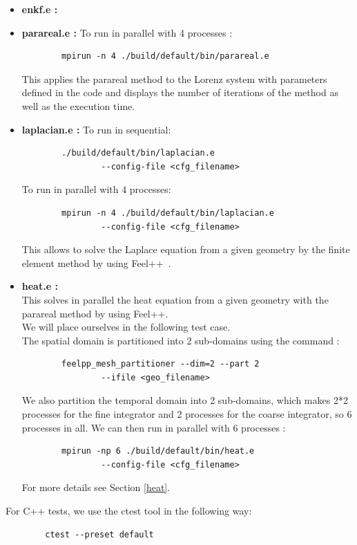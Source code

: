 \begin{enumerate}[label=\textbullet]
		\begin{itemize}[label=-]
			\item \textbf{enkf.e : } 
			\item \textbf{parareal.e : } To run in parallel with 4 processes :
\begin{lstlisting}
		mpirun -n 4 ./build/default/bin/parareal.e
\end{lstlisting}
			This applies the parareal method to the Lorenz system with parameters defined in the code and displays the number of iterations of the method as well as the execution time. 
			\item \textbf{laplacian.e : } To run in sequential:
\begin{lstlisting}
		./build/default/bin/laplacian.e 
				--config-file <cfg_filename>
\end{lstlisting}
			To run in parallel with 4 processes:
\begin{lstlisting}
		mpirun -n 4 ./build/default/bin/laplacian.e 
				--config-file <cfg_filename>
\end{lstlisting}
			This allows to solve the Laplace equation from a given geometry by the finite element method by using Feel++~\cite{feelpp_laplacian}.
			\item \textbf{heat.e : } \\
			This solves in parallel the heat equation from a given geometry with the parareal method by using Feel++. \\
			We will place ourselves in the following test case. \\
			The spatial domain is partitioned into 2 sub-domains using the command :
\begin{lstlisting}
		feelpp_mesh_partitioner --dim=2 --part 2 
				--ifile <geo_filename> 
\end{lstlisting}
			We also partition the temporal domain into 2 sub-domains, which makes 2*2 processes for the fine integrator and 2 processes for the coarse integrator, so 6 processes in all. We can then run in parallel with 6 processes :
\begin{lstlisting}
		mpirun -np 6 ./build/default/bin/heat.e 
				--config-file <cfg_filename>
\end{lstlisting}		
		For more details see Section \ref{heat}.
		\end{itemize}
		For C++ tests, we use the ctest tool in the following way:
\begin{lstlisting}
		ctest --preset default
\end{lstlisting}
	\end{enumerate}

